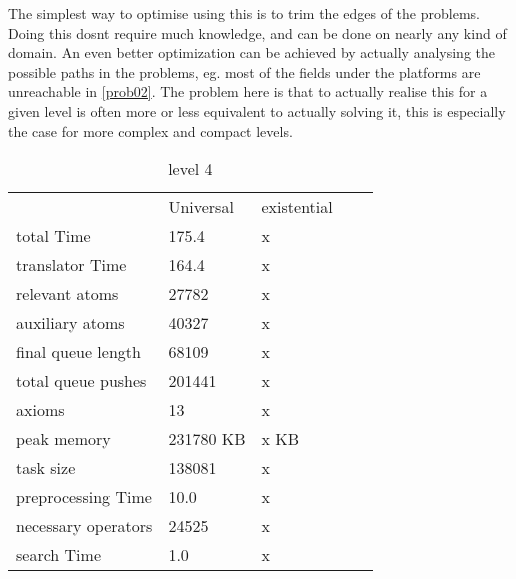 			The simplest way to optimise using this is to trim the edges of the problems. Doing this dosnt require much knowledge, and can be done on nearly any kind of domain.	An even better optimization can be achieved by actually analysing the possible paths in the problems, eg. most of the fields under the platforms are unreachable in \ref{prob02}. The problem here is that to actually realise this for a given level is often more or less equivalent to actually solving it, this is especially the case for more complex and compact levels. 
		
			
			\begin{table}[h]
				\centering
				\caption{level 4}
				\label{lvl4}
				\begin{tabular}{lllll}
					& Universal & existential  \\
					total Time& 175.4 & x \\
					translator Time& 164.4 &x  \\
					
					
					relevant atoms & 27782 & x\\
					auxiliary atoms & 40327 &x \\
					final queue length & 68109 &x \\
					total queue pushes & 201441 &x \\
					axioms & 13 & x \\ 
					peak memory & 231780 KB &x  KB\\ 
					task size & 138081 &x \\
					
					preprocessing Time& 10.0 &  x\\
					necessary operators & 24525 & x\\
					
					search Time & 1.0 &x  \\
				\end{tabular}
			\end{table}
			

